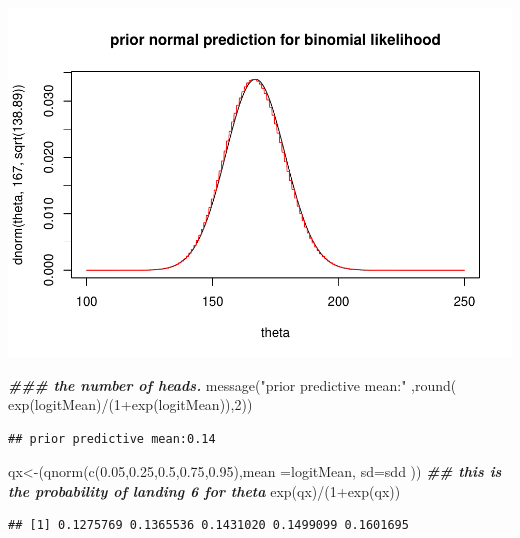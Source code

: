 \documentclass[
]{book}
\newenvironment{Shaded}{\begin{snugshade}}{\end{snugshade}}
\newcommand{\AttributeTok}[1]{\textcolor[rgb]{0.77,0.63,0.00}{#1}}
\newcommand{\DecValTok}[1]{\textcolor[rgb]{0.00,0.00,0.81}{#1}}
\newcommand{\DocumentationTok}[1]{\textcolor[rgb]{0.56,0.35,0.01}{\textbf{\textit{#1}}}}
\newcommand{\FloatTok}[1]{\textcolor[rgb]{0.00,0.00,0.81}{#1}}
\newcommand{\FunctionTok}[1]{\textcolor[rgb]{0.00,0.00,0.00}{#1}}
\newcommand{\NormalTok}[1]{#1}
\newcommand{\OtherTok}[1]{\textcolor[rgb]{0.56,0.35,0.01}{#1}}
\newcommand{\SpecialCharTok}[1]{\textcolor[rgb]{0.00,0.00,0.00}{#1}}
\newcommand{\StringTok}[1]{\textcolor[rgb]{0.31,0.60,0.02}{#1}}
\theoremstyle{definition}
\theoremstyle{definition}
\theoremstyle{definition}
\theoremstyle{definition}
\theoremstyle{remark}
\begin{document}
\includegraphics{_main_files/figure-latex/unnamed-chunk-13-1.pdf}

\begin{Shaded}
\begin{Highlighting}[]
    \DocumentationTok{\#\#\# the number of heads.    }
  \FunctionTok{message}\NormalTok{(}\StringTok{"prior predictive mean:"}\NormalTok{ ,}\FunctionTok{round}\NormalTok{( }\FunctionTok{exp}\NormalTok{(logitMean)}\SpecialCharTok{/}\NormalTok{(}\DecValTok{1}\SpecialCharTok{+}\FunctionTok{exp}\NormalTok{(logitMean)),}\DecValTok{2}\NormalTok{))}
\end{Highlighting}
\end{Shaded}

\begin{verbatim}
## prior predictive mean:0.14
\end{verbatim}

\begin{Shaded}
\begin{Highlighting}[]
\NormalTok{ qx}\OtherTok{\textless{}{-}}\NormalTok{(}\FunctionTok{qnorm}\NormalTok{(}\FunctionTok{c}\NormalTok{(}\FloatTok{0.05}\NormalTok{,}\FloatTok{0.25}\NormalTok{,}\FloatTok{0.5}\NormalTok{,}\FloatTok{0.75}\NormalTok{,}\FloatTok{0.95}\NormalTok{),}\AttributeTok{mean =}\NormalTok{logitMean, }\AttributeTok{sd=}\NormalTok{sdd ))}
 \DocumentationTok{\#\# this is the probability of landing 6 for theta}
 \FunctionTok{exp}\NormalTok{(qx)}\SpecialCharTok{/}\NormalTok{(}\DecValTok{1}\SpecialCharTok{+}\FunctionTok{exp}\NormalTok{(qx))}
\end{Highlighting}
\end{Shaded}

\begin{verbatim}
## [1] 0.1275769 0.1365536 0.1431020 0.1499099 0.1601695
\end{verbatim}
\end{document}
